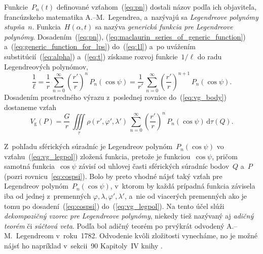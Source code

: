 \documentclass[a4paper, 12pt]{book}
\newcommand{\diff}{\mathrm d}
\newcommand{\gidx}{\mathrm g}
\begin{document}
Funkcie~$P_n(t)$ definované vzťahom~(\ref{eq:pn}) dostali názov podľa ich 
objaviteľa, francúzskeho matematika A.--M.~Legendrea, a~nazývajú sa 
\emph{Legendreove polynómy stupňa~$n$}.  Funkcia~$H(\alpha, t)$ sa nazýva 
\emph{generická funkcia pre Legendreove polynómy}.  Dosadením~(\ref{eq:pn}), 
(\ref{eq:maclaurin_series_of_generic_function}) 
a~(\ref{eq:generic_function_for_lps}) do~(\ref{eq:1l}) a~po uvážením 
substitúcií~(\ref{eq:alpha}) a~(\ref{eq:t}) získame rozvoj funkcie~$1 \slash 
\ell$ do radu Legendreových polynómov,
%
\begin{equation}
\label{eq:1l_legpol}
\frac{1}{\ell} = \frac{1}{r} \, \sum_{n = 0}^\infty \left( \frac{r'}{r} 
\right)^{n} \, P_n(\cos\psi) = \frac{1}{r'} \, \sum_{n = 0}^\infty \left( 
\frac{r'}{r} \right)^{n + 1} \, P_n(\cos\psi){.}
\end{equation}
%
Dosadením prostredného výrazu z~poslednej rovnice do~(\ref{eq:vg_body}) 
dostaneme vzťah
%
\begin{equation}
\label{eq:vg_legpol}
V_\gidx(P) = \frac{G}{r} \, \iiint\limits_{\tau} \rho(r', \varphi', \lambda') 
\, \sum_{n = 0}^{\infty} \left( \frac{r'}{r} \right)^n \, P_n(\cos\psi) \, 
\diff\tau(Q){.}
\end{equation}

Z~pohľadu sférických súradníc je Legendreov polynóm~$P_n(\cos\psi)$ vo 
vzťahu~(\ref{eq:vg_legpol}) zložená funkcia, pretože je funkciou~$\cos\psi$, 
pričom samotná funkcia~$\cos\psi$ závisí od uhlovej časti sférických súradníc 
bodov~$Q$ a~$P$ (pozri rovnicu~\ref{eq:cospsi}).  Bolo by preto vhodné nájsť 
taký vzťah pre Legendreov polynóm~$P_n(\cos\psi)$,
v~ktorom by každá prípadná funkcia závisela iba od jednej z~premenných
$\varphi,  \lambda, \varphi', \lambda'$, a~nie od viacerých
premenných ako je tomu po dosadení~(\ref{eq:cospsi})
do~(\ref{eq:vg_legpol}).  Na tento účel slúži \emph{dekompozičný vzorec pre
Legendreove polynómy}, niekedy tiež nazývaný aj \emph{adičný teorém} či 
\emph{súčtová veta}.  Podľa \textcite{Hobson} bol adičný teorém po prvýkrát 
odvodený A.--M.~Legendreom v~roku~1782.  Odvodenie kvôli zložitosti vynecháme, 
no je možné nájsť ho napríklad v~sekcii~90 Kapitoly~IV knihy \textcite{Hobson}.
\end{document}
